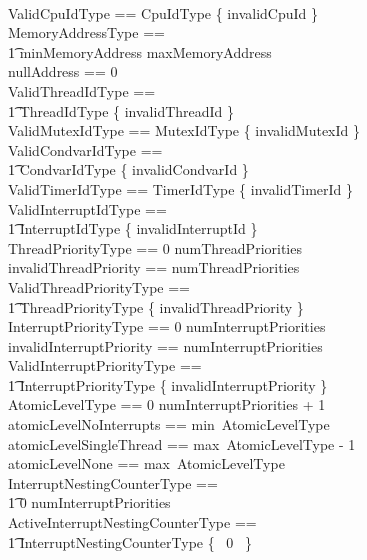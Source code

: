 \documentclass[11pt,letterpaper,twoside,openany]{book}
\begin{document}
\begin{zed}
    [CpuRegistersType] \\
    ValidCpuIdType == CpuIdType \setminus \{ invalidCpuId \} \\
    MemoryAddressType == \\
    \t1 minMemoryAddress \upto maxMemoryAddress \\
    nullAddress == 0 \\
    ValidThreadIdType == \\
    \t1 ThreadIdType \setminus \{ invalidThreadId \} \\
    ValidMutexIdType == MutexIdType \setminus \{ invalidMutexId \} \\
    ValidCondvarIdType == \\
    \t1 CondvarIdType \setminus \{ invalidCondvarId \} \\
    ValidTimerIdType == TimerIdType \setminus \{ invalidTimerId \} \\
    ValidInterruptIdType == \\
    \t1 InterruptIdType \setminus \{ invalidInterruptId \} \\
    ThreadPriorityType == 0 \upto numThreadPriorities \\
    invalidThreadPriority == numThreadPriorities \\
    ValidThreadPriorityType == \\
    \t1 ThreadPriorityType \setminus \{ invalidThreadPriority \} \\
    InterruptPriorityType == 0 \upto numInterruptPriorities \\
    invalidInterruptPriority == numInterruptPriorities \\
    ValidInterruptPriorityType == \\
    \t1 InterruptPriorityType \setminus \{ invalidInterruptPriority \} \\
    AtomicLevelType == 0 \upto numInterruptPriorities + 1 \\
    atomicLevelNoInterrupts == min~AtomicLevelType \\
    atomicLevelSingleThread == max~AtomicLevelType - 1 \\
    atomicLevelNone == max~AtomicLevelType \\
    InterruptNestingCounterType == \\
    \t1 0 \upto numInterruptPriorities \\
    ActiveInterruptNestingCounterType == \\
    \t1 InterruptNestingCounterType \setminus \{~ 0 ~\} \\

\end{zed}
\end{document}
